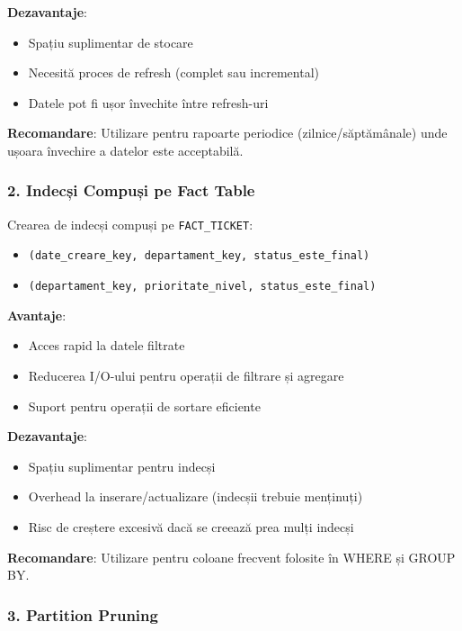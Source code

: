 \textbf{Dezavantaje}:
\begin{itemize}
    \item Spațiu suplimentar de stocare
    \item Necesită proces de refresh (complet sau incremental)
    \item Datele pot fi ușor învechite între refresh-uri
\end{itemize}

\textbf{Recomandare}: Utilizare pentru rapoarte periodice (zilnice/săptămânale) unde ușoara învechire a datelor este acceptabilă.

\subsubsection{2. Indecși Compuși pe Fact Table}

Crearea de indecși compuși pe \texttt{FACT\_TICKET}:
\begin{itemize}
    \item \texttt{(date\_creare\_key, departament\_key, status\_este\_final)}
    \item \texttt{(departament\_key, prioritate\_nivel, status\_este\_final)}
\end{itemize}

\textbf{Avantaje}:
\begin{itemize}
    \item Acces rapid la datele filtrate
    \item Reducerea I/O-ului pentru operații de filtrare și agregare
    \item Suport pentru operații de sortare eficiente
\end{itemize}

\textbf{Dezavantaje}:
\begin{itemize}
    \item Spațiu suplimentar pentru indecși
    \item Overhead la inserare/actualizare (indecșii trebuie menținuți)
    \item Risc de creștere excesivă dacă se creează prea mulți indecși
\end{itemize}

\textbf{Recomandare}: Utilizare pentru coloane frecvent folosite în WHERE și GROUP BY.

\subsubsection{3. Partition Pruning}

